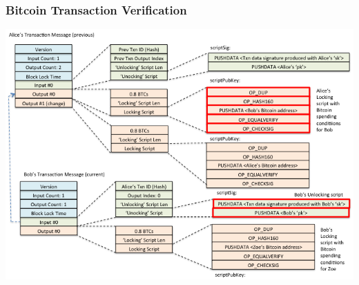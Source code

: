 \begin{frame}
    \frametitle{Bitcoin Transaction Verification}
    \includegraphics[scale=0.5]{./figures/bitcoin-transaction1.png}
\end{frame}
